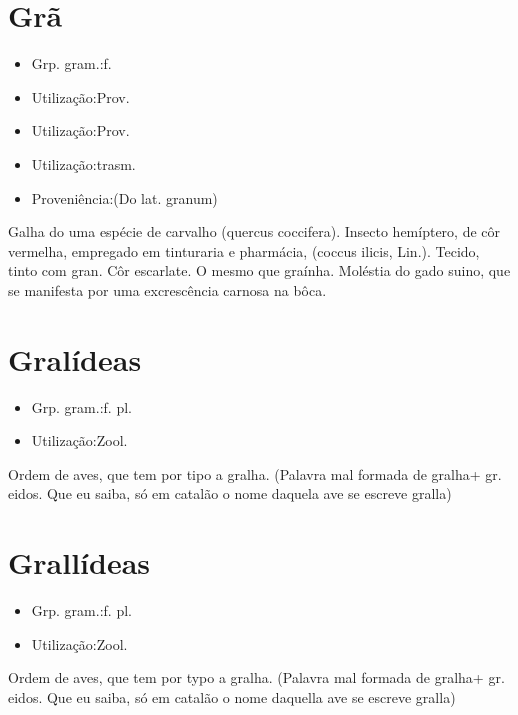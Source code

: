 \section{Grã}
\begin{itemize}
\item {Grp. gram.:f.}
\end{itemize}
\begin{itemize}
\item {Utilização:Prov.}
\end{itemize}
\begin{itemize}
\item {Utilização:Prov.}
\end{itemize}
\begin{itemize}
\item {Utilização:trasm.}
\end{itemize}
\begin{itemize}
\item {Proveniência:(Do lat. \textunderscore granum\textunderscore )}
\end{itemize}
Galha do uma espécie de carvalho (\textunderscore quercus coccifera\textunderscore ).
Insecto hemíptero, de côr vermelha, empregado em tinturaria e pharmácia, (\textunderscore coccus ilicis\textunderscore , Lin.).
Tecido, tinto com gran.
Côr escarlate.
O mesmo que \textunderscore graínha\textunderscore .
Moléstia do gado suino, que se manifesta por uma excrescência carnosa na bôca.
\section{Gralídeas}
\begin{itemize}
\item {Grp. gram.:f. pl.}
\end{itemize}
\begin{itemize}
\item {Utilização:Zool.}
\end{itemize}
Ordem de aves, que tem por tipo a gralha.
(Palavra mal formada de \textunderscore gralha\textunderscore  + gr. \textunderscore eidos\textunderscore . Que eu saiba, só em catalão o nome daquela ave se escreve \textunderscore gralla\textunderscore )
\section{Grallídeas}
\begin{itemize}
\item {Grp. gram.:f. pl.}
\end{itemize}
\begin{itemize}
\item {Utilização:Zool.}
\end{itemize}
Ordem de aves, que tem por typo a gralha.
(Palavra mal formada de \textunderscore gralha\textunderscore  + gr. \textunderscore eidos\textunderscore . Que eu saiba, só em catalão o nome daquella ave se escreve \textunderscore gralla\textunderscore )

